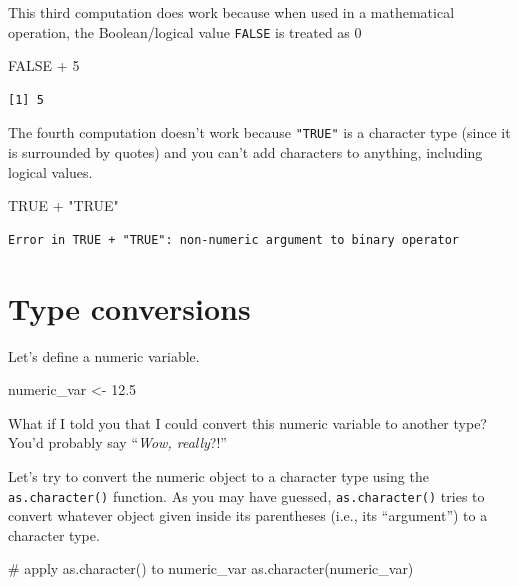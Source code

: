 \documentclass[
  letterpaper,
  DIV=11,
  numbers=noendperiod]{scrreprt}
\newenvironment{Shaded}{\begin{snugshade}}{\end{snugshade}}
\newcommand{\CommentTok}[1]{\textcolor[rgb]{0.37,0.37,0.37}{#1}}
\newcommand{\ConstantTok}[1]{\textcolor[rgb]{0.56,0.35,0.01}{#1}}
\newcommand{\DecValTok}[1]{\textcolor[rgb]{0.68,0.00,0.00}{#1}}
\newcommand{\FloatTok}[1]{\textcolor[rgb]{0.68,0.00,0.00}{#1}}
\newcommand{\FunctionTok}[1]{\textcolor[rgb]{0.28,0.35,0.67}{#1}}
\newcommand{\NormalTok}[1]{\textcolor[rgb]{0.00,0.23,0.31}{#1}}
\newcommand{\OtherTok}[1]{\textcolor[rgb]{0.00,0.23,0.31}{#1}}
\newcommand{\SpecialCharTok}[1]{\textcolor[rgb]{0.37,0.37,0.37}{#1}}
\newcommand{\StringTok}[1]{\textcolor[rgb]{0.13,0.47,0.30}{#1}}
\begin{document}
This third computation does work because when used in a mathematical
operation, the Boolean/logical value \texttt{FALSE} is treated as 0

\begin{Shaded}
\begin{Highlighting}[]
\ConstantTok{FALSE} \SpecialCharTok{+} \DecValTok{5}
\end{Highlighting}
\end{Shaded}

\begin{verbatim}
[1] 5
\end{verbatim}

The fourth computation doesn't work because \texttt{"TRUE"} is a
character type (since it is surrounded by quotes) and you can't add
characters to anything, including logical values.

\begin{Shaded}
\begin{Highlighting}[]
\ConstantTok{TRUE} \SpecialCharTok{+} \StringTok{"TRUE"}
\end{Highlighting}
\end{Shaded}

\begin{verbatim}
Error in TRUE + "TRUE": non-numeric argument to binary operator
\end{verbatim}

\section{Type conversions}\label{type-conversions}

Let's define a numeric variable.

\begin{Shaded}
\begin{Highlighting}[]
\NormalTok{numeric\_var }\OtherTok{\textless{}{-}} \FloatTok{12.5}
\end{Highlighting}
\end{Shaded}

What if I told you that I could convert this numeric variable to another
type? You'd probably say ``\emph{Wow, really}?!''

Let's try to convert the numeric object to a character type using the
\texttt{as.character()} function. As you may have guessed,
\texttt{as.character()} tries to convert whatever object given inside
its parentheses (i.e., its ``argument'') to a character type.

\begin{Shaded}
\begin{Highlighting}[]
\CommentTok{\# apply as.character() to numeric\_var}
\FunctionTok{as.character}\NormalTok{(numeric\_var)}
\end{Highlighting}
\end{Shaded}
\end{document}
